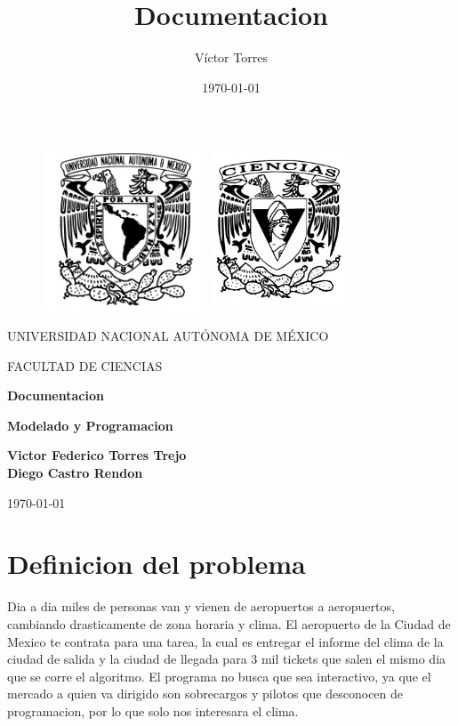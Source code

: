 \documentclass[12pt]{article}
\author{Víctor Torres}
\date{\today}
\title{Documentacion}
\begin{document}
\thispagestyle{empty}
\begin{figure}[h!]
  \includegraphics[height = 4.9cm ]{figures/Logo_UNAM.png}
  \label{EscudoUNAM}
  \endminipage
  \includegraphics[height = 4.9cm ,width=4cm]{figures/Logo_FC.png}
  \label{EscudoCiencias}
  \endminipage
\end{figure}

\begin{center}
  \vspace{1cm}
  \LARGE
  UNIVERSIDAD NACIONAL AUTÓNOMA DE MÉXICO
  
  \vspace{1cm}
  \LARGE
  FACULTAD DE CIENCIAS
  
  \vspace{1.5cm}	
  \Large
  \textbf{Documentacion}
  
  \vspace{1.5cm}
  \large
  \textbf{Modelado y Programacion}
  
  \vspace{1.5cm}
  \large
  \textbf{Victor Federico Torres Trejo\\Diego Castro Rendon}
  
  \vspace{1cm}
  \today
\end{center}
\tableofcontents
\newpage

\section{Definicion del problema}
Dia a dia miles de personas van y vienen de aeropuertos a aeropuertos, cambiando drasticamente de zona horaria y clima. El aeropuerto de la Ciudad de Mexico te contrata para una tarea, la cual es entregar el informe del clima de la ciudad de salida y la ciudad de llegada para 3 mil tickets que salen el mismo dia que se corre el algoritmo.
El programa no busca que sea interactivo, ya que el mercado a quien va dirigido son sobrecargos y pilotos que desconocen de programacion, por lo que solo nos interesara el clima.
\end{document}
